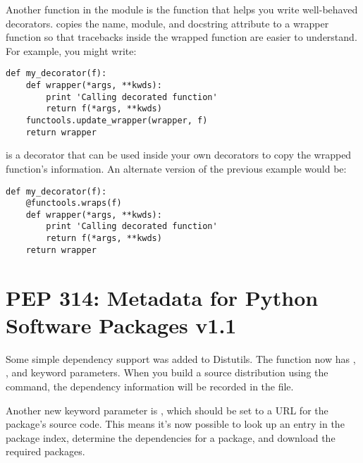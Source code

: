 \documentclass{howto}
\begin{document}
Another function in the  module is the
 function that
helps you write well-behaved decorators.  
copies the name, module, and docstring attribute to a wrapper function
so that tracebacks inside the wrapped function are easier to
understand.  For example, you might write:

\begin{verbatim}
def my_decorator(f):
    def wrapper(*args, **kwds):
        print 'Calling decorated function'
        return f(*args, **kwds)
    functools.update_wrapper(wrapper, f)
    return wrapper
\end{verbatim}

 is a decorator that can be used inside your own
decorators to copy the wrapped function's information.  An alternate 
version of the previous example would be:

\begin{verbatim}
def my_decorator(f):
    @functools.wraps(f)
    def wrapper(*args, **kwds):
        print 'Calling decorated function'
        return f(*args, **kwds)
    return wrapper
\end{verbatim}

\begin{seealso}


\end{seealso}


\section{PEP 314: Metadata for Python Software Packages v1.1\label{pep-314}}

Some simple dependency support was added to Distutils.  The
 function now has , ,
and  keyword parameters.  When you build a source
distribution using the  command, the dependency
information will be recorded in the  file.

Another new keyword parameter is , which should be
set to a URL for the package's source code.  This means it's now
possible to look up an entry in the package index, determine the
dependencies for a package, and download the required packages.
\end{document}
